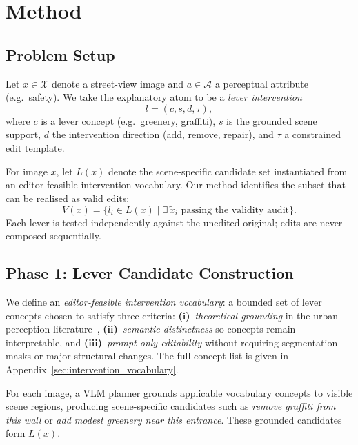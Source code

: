 \section{Method}
\label{sec:method}

\subsection{Problem Setup}

Let $x \in \mathcal{X}$ denote a street-view image and
$a \in \mathcal{A}$ a perceptual attribute (e.g.\ safety). We take the
explanatory atom to be a \emph{lever intervention}
\begin{equation}
  l = (c, s, d, \tau),
\end{equation}
where $c$ is a lever concept (e.g.\ greenery, graffiti), $s$ is the
grounded scene support, $d$ the intervention direction (add, remove,
repair), and $\tau$ a constrained edit template.

For image $x$, let $L(x)$ denote the scene-specific candidate set
instantiated from an editor-feasible intervention vocabulary. Our method identifies the
subset that can be realised as valid edits:
\begin{equation}
  V(x) = \{ l_i \in L(x) \mid \exists\, \tilde{x}_i \text{ passing the validity audit} \}.
\end{equation}
Each lever is tested independently against the unedited original; edits
are never composed sequentially.

\subsection{Phase 1: Lever Candidate Construction}

We define an \emph{editor-feasible intervention vocabulary}: a bounded
set of lever concepts chosen to satisfy three criteria:
\textbf{(i)}~\emph{theoretical grounding} in the urban perception
literature~\cite{jacobs1961,newman1972,li2015greenery,jiang2018brokenwindows,portnov2020lighting},
\textbf{(ii)}~\emph{semantic distinctness} so concepts remain
interpretable, and \textbf{(iii)}~\emph{prompt-only editability}
without requiring segmentation masks or major structural changes.
The full concept list is given in Appendix~\ref{sec:intervention_vocabulary}.

For each image, a VLM planner grounds applicable vocabulary concepts to
visible scene regions, producing scene-specific candidates such as
\emph{remove graffiti from this wall} or \emph{add modest greenery near
this entrance}. These grounded candidates form $L(x)$.

